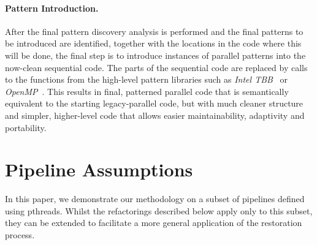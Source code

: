 

\paragraph{Pattern Introduction.}
After the final pattern discovery analysis is performed and the final patterns to be introduced are identified, together with the locations in the code where this will be done, the final step is to introduce instances of parallel patterns into the now-clean sequential code.
The parts of the sequential code are replaced by calls to the functions from the high-level pattern libraries such as \emph{Intel TBB}~\cite{DBLP:reference/parallel/X11pz} or \emph{OpenMP}~\cite{10.1109/99.660313}.
This results in final, patterned parallel code that is semantically equivalent to the starting legacy-parallel code, but with much cleaner structure and simpler, higher-level code that allows easier maintainability, adaptivity and portability.


\section{Pipeline Assumptions}
\label{sec:assumptions}

In this paper, we demonstrate our methodology on a subset of pipelines defined using pthreads. Whilst the refactorings described below apply only to this subset, they can be extended to facilitate a more general application of the restoration process.

